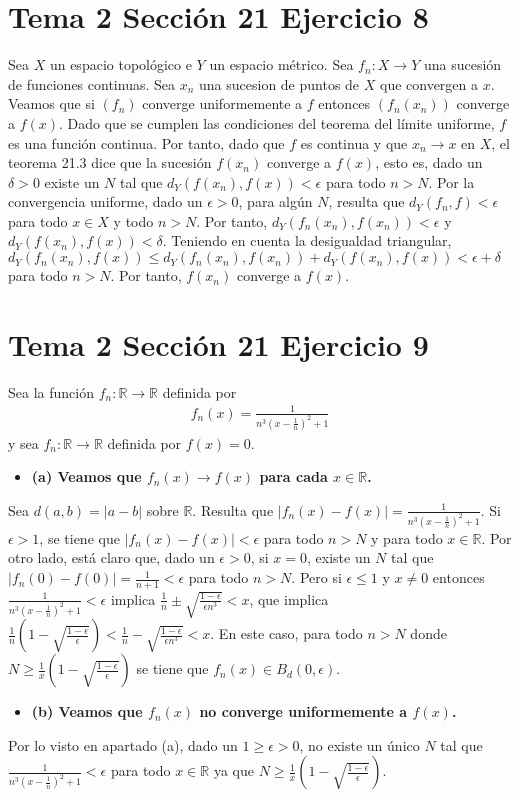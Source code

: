 \documentclass{article}
\begin{document}
\section{Tema 2 Sección 21 Ejercicio 8}
Sea $X$ un espacio topológico e $Y$ un espacio métrico. Sea $f_n:X\rightarrow Y$ una sucesión de funciones continuas. Sea $x_n$ una sucesion de puntos de $X$ que convergen a $x$. Veamos que si $(f_n)$ converge uniformemente a $f$ entonces $(f_n(x_n))$ converge a $f(x)$. Dado que se cumplen las condiciones del teorema del límite uniforme, $f$ es una función continua. Por tanto, dado que $f $ es continua y que $x_n\rightarrow x$ en $X$, el teorema 21.3 dice que la sucesión $f(x_n)$ converge a $f(x)$, esto es, dado un $\delta>0$ existe un $N$ tal que $d_Y(f(x_n),f(x))<\epsilon$ para todo $n>N$. Por la convergencia uniforme, dado un $\epsilon>0$, para algún $N$, resulta que $d_Y(f_n,f)<\epsilon$ para todo $x\in X$ y todo $n>N$. Por tanto, $d_Y(f_n(x_n),f(x_n))<\epsilon$ y $d_Y(f(x_n),f(x))<\delta$. Teniendo en cuenta la desigualdad triangular, $d_Y(f_n(x_n),f(x))\leq d_Y(f_n(x_n),f(x_n))+d_Y(f(x_n),f(x))<\epsilon+\delta$ para todo $n>N$. Por tanto, $f(x_n)$ converge a $f(x)$.
\section{Tema 2 Sección 21 Ejercicio 9}
Sea la función $f_n:\mathbb{R}\rightarrow \mathbb{R}$ definida por
\begin{eqnarray}
f_n(x)=\frac{1}{n^3\left(x-\frac{1}{n}\right)^2+ 1}
\end{eqnarray}
y sea $f_n:\mathbb{R}\rightarrow \mathbb{R}$ definida por $f(x)=0$.
\begin{itemize}
\item \bf (a) \rm Veamos que $f_n(x)\rightarrow f(x)$ para cada $x\in \mathbb{R}$.
\end{itemize}
Sea $d(a,b)=|a-b|$ sobre $\mathbb{R}$. Resulta que $|f_n(x)-f(x)|=\frac{1}{n^3\left(x-\frac{1}{n}\right)^2+ 1}$. Si $\epsilon>1$, se tiene que $|f_n(x)- f(x)|<\epsilon$ para todo $n>N$ y para todo $x\in \mathbb{R}$. Por otro lado, está claro que, dado un $\epsilon >0$, si $x=0$, existe un $N$ tal que $|f_n(0)-f(0)|=\frac{1}{n+ 1}<\epsilon$ para todo $n>N$. Pero si $\epsilon\leq 1$ y $x\neq 0$ entonces $\frac{1}{n^3\left(x-\frac{1}{n}\right)^2+ 1}<\epsilon$ implica $\frac{1}{n}\pm\sqrt{\frac{1-\epsilon}{\epsilon n^3}}<x$, que implica $\frac{1}{n}\left(1-\sqrt{\frac{1-\epsilon}{\epsilon}}\right)<\frac{1}{n}-\sqrt{\frac{1-\epsilon}{\epsilon n^3}}<x$. En este caso, para todo $n>N$ donde $N\geq\frac{1}{x}\left(1-\sqrt{\frac{1-\epsilon}{\epsilon}}\right)$ se tiene que $f_n(x)\in B_d(0,\epsilon)$. 
\begin{itemize}
\item \bf (b) \rm Veamos que  $f_n(x)$ no converge uniformemente a $f(x)$.
\end{itemize}
Por lo visto en apartado (a), dado un $1\geq \epsilon>0$, no existe un único $N$ tal que $\frac{1}{n^3\left(x-\frac{1}{n}\right)^2+ 1}<\epsilon$ para todo $x\in \mathbb{R}$ ya que $N\geq \frac{1}{x}\left(1-\sqrt{\frac{1-\epsilon}{\epsilon}}\right)$.
\end{document}
